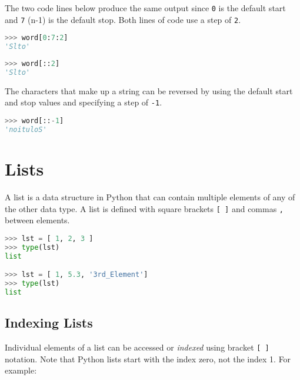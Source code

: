 \documentclass{book}
\newcommand{\passthrough}[1]{#1}
\begin{document}
The two code lines below produce the same output since
\passthrough{\lstinline!0!} is the default start and
\passthrough{\lstinline!7!} (n-1) is the default stop. Both lines of
code use a step of \passthrough{\lstinline!2!}.

\begin{lstlisting}[language=Python]
>>> word[0:7:2]
'Slto'
\end{lstlisting}

\begin{lstlisting}[language=Python]
>>> word[::2]
'Slto'
\end{lstlisting}

The characters that make up a string can be reversed by using the
default start and stop values and specifying a step of
\passthrough{\lstinline!-1!}.

\begin{lstlisting}[language=Python]
>>> word[::-1]
'noituloS'
\end{lstlisting}
    




    
        \hypertarget{lists}{%
\section{Lists}\label{lists}}
    




    
        A list is a data structure in Python that can contain multiple elements
of any of the other data type. A list is defined with square brackets
\passthrough{\lstinline![ ]!} and commas \passthrough{\lstinline!,!}
between elements.

\begin{lstlisting}[language=Python]
>>> lst = [ 1, 2, 3 ]
>>> type(lst)
list

>>> lst = [ 1, 5.3, '3rd_Element']
>>> type(lst)
list
\end{lstlisting}
    




    
        \hypertarget{indexing-lists}{%
\subsection{Indexing Lists}\label{indexing-lists}}

Individual elements of a list can be accessed or \emph{indexed} using
bracket \passthrough{\lstinline![ ]!} notation. Note that Python lists
start with the index zero, not the index 1. For example:
\end{document}
